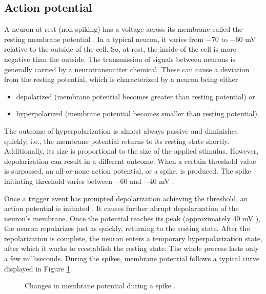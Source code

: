 \subsection{Action potential}
\label{sec:action-potential}

A neuron at rest (non-spiking) has a voltage across its membrane called the resting membrane potential \cite{KandelBook2003:6}. In a typical neuron, it varies from $-70$ to $-60$ mV relative to the outside of the cell. So, at rest, the inside of the cell is more negative than the outside. The transmission of signals between neurons is generally carried by a neurotransmitter chemical. These can cause a deviation from the resting potential, which is characterized by a neuron being either
\begin{itemize}
    \item depolarized (membrane potential becomes greater than resting potential) or
    
    \item hyperpolarized (membrane potential becomes smaller than resting potential).
\end{itemize}

The outcome of hyperpolarization is almost always passive and diminishes quickly, i.e., the membrane potential returns to its resting state shortly. Additionally, its size is proportional to the size of the applied stimulus. However, depolarization can result in a different outcome. When a certain threshold value is surpassed, an all-or-none action potential, or a spike, is produced. The spike initiating threshold varies between $-60$ and $-40$ mV \cite{Platkiewicz2010}. 

Once a trigger event has prompted depolarization achieving the threshold, an action potential is initiated \cite{KandelBook2003:7}. It causes further abrupt depolarization of the neuron's membrane. Once the potential reaches its peak (approximately $40$ mV \cite{ClarkBook2018:35.2}), the neuron repolarizes just as quickly, returning to the resting state. After the repolarization is complete, the neuron enters a temporary hyperpolarization state, after which it works to reestablish the resting state. The whole process lasts only a few milliseconds. During the spikes, membrane potential follows a typical curve displayed in Figure \ref{fig:action-potential}.

\begin{figure}
    \centering
    
    \caption{Changes in membrane potential during a spike \cite{ClarkBook2018:35.2}.}
    \label{fig:action-potential}
\end{figure}
